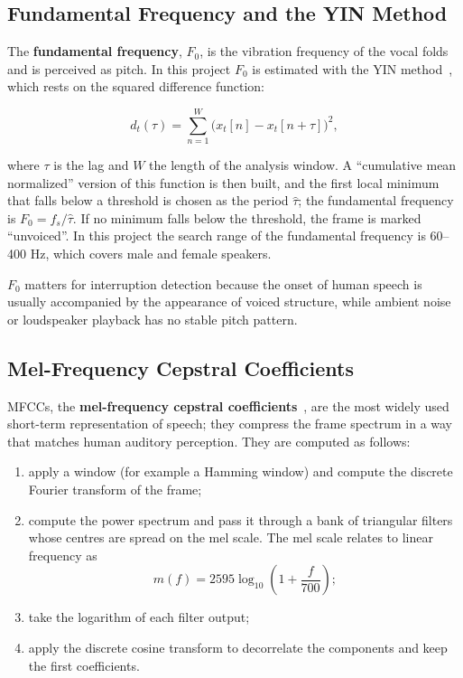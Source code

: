\subsection{Fundamental Frequency and the YIN Method}

The \textbf{fundamental frequency}, $F_0$, is the vibration frequency of the
vocal folds and is perceived as pitch. In this project $F_0$ is estimated with the
YIN method~\cite{decheveigne2002yin}, which rests on the squared difference
function:

\begin{equation}
d_t(\tau) = \sum_{n=1}^{W} \bigl(x_t[n] - x_t[n+\tau]\bigr)^2,
\label{eq:yin-diff}
\end{equation}

where $\tau$ is the lag and $W$ the length of the analysis window. A
``cumulative mean normalized'' version of this function is then built, and the
first local minimum that falls below a threshold is chosen as the period
$\hat{\tau}$; the fundamental frequency is $F_0 = f_s / \hat{\tau}$. If no minimum
falls below the threshold, the frame is marked ``unvoiced''. In this project the
search range of the fundamental frequency is 60--400 Hz, which covers male and
female speakers.

$F_0$ matters for interruption detection because the onset of human speech is
usually accompanied by the appearance of voiced structure, while ambient noise or
loudspeaker playback has no stable pitch pattern.

\subsection{Mel-Frequency Cepstral Coefficients}

MFCCs, the \textbf{mel-frequency cepstral coefficients}~\cite{davis1980mfcc}, are
the most widely used short-term representation of speech; they compress the
frame spectrum in a way that matches human auditory perception. They are computed
as follows:

\begin{enumerate}
\item apply a window (for example a Hamming window) and compute the discrete
      Fourier transform of the frame;
\item compute the power spectrum and pass it through a bank of triangular filters
      whose centres are spread on the mel scale. The mel scale relates to linear
      frequency as
      \begin{equation}
      m(f) = 2595 \log_{10}\!\left(1 + \frac{f}{700}\right);
      \label{eq:mel}
      \end{equation}
\item take the logarithm of each filter output;
\item apply the discrete cosine transform to decorrelate the components and keep
      the first coefficients.
\end{enumerate}

